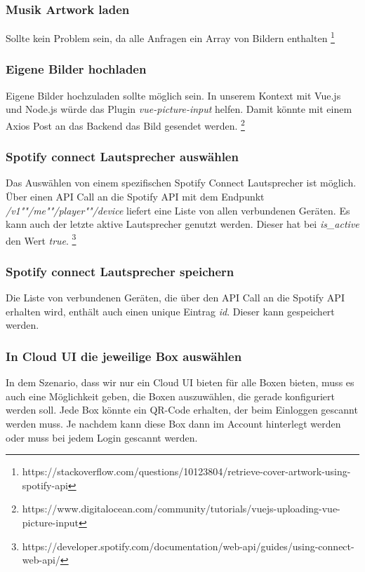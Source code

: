 \documentclass[10pt, a4paper, draft]{article}
\begin{document}
\subsubsection{Musik Artwork laden}
Sollte kein Problem sein, da alle Anfragen ein Array von Bildern enthalten \footnote{https://stackoverflow.com/questions/10123804/retrieve-cover-artwork-using-spotify-api}

\subsubsection{Eigene Bilder hochladen}
Eigene Bilder hochzuladen sollte möglich sein. In unserem Kontext mit Vue.js und Node.js würde das Plugin \textit{vue-picture-input} helfen.
Damit könnte mit einem Axios Post an das Backend das Bild gesendet werden. \footnote{https://www.digitalocean.com/community/tutorials/vuejs-uploading-vue-picture-input}

\subsubsection{Spotify connect Lautsprecher auswählen}
Das Auswählen von einem spezifischen Spotify Connect Lautsprecher ist möglich.
Über einen API Call an die Spotify API mit dem Endpunkt \textit{/v1""/me""/player""/device} liefert eine Liste von allen verbundenen Geräten.
Es kann auch der letzte aktive Lautsprecher genutzt werden. Dieser hat bei \textit{is\_active} den Wert \textit{true}. \footnote{https://developer.spotify.com/documentation/web-api/guides/using-connect-web-api/}

\subsubsection{Spotify connect Lautsprecher speichern}
Die Liste von verbundenen Geräten, die über den API Call an die Spotify API erhalten wird, enthält auch einen unique Eintrag \textit{id}. Dieser kann gespeichert werden.

\subsubsection{In Cloud UI die jeweilige Box auswählen}
In dem Szenario, dass wir nur ein Cloud UI bieten für alle Boxen bieten, muss es auch eine Möglichkeit geben, die Boxen auszuwählen, die gerade konfiguriert werden soll.
Jede Box könnte ein QR-Code erhalten, der beim Einloggen gescannt werden muss. Je nachdem kann diese Box dann im Account hinterlegt werden oder muss bei jedem Login gescannt werden.
\end{document}
